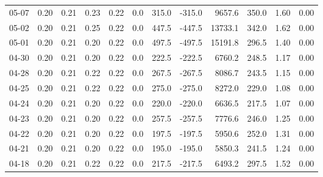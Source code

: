 \begin{threeparttable}
{\begin{tabular}{lrrrrrrrrrrr}
  05-07 &          0.20 &          0.21 &          0.23 &        0.22 &                 0.0 &               315.0 &     -315.0 &              9657.6 &            350.0 &            1.60 &                   0.00 \\
  05-02 &          0.20 &          0.21 &          0.25 &        0.22 &                 0.0 &               447.5 &     -447.5 &             13733.1 &            342.0 &            1.62 &                   0.00 \\
  05-01 &          0.20 &          0.21 &          0.20 &        0.22 &                 0.0 &               497.5 &     -497.5 &             15191.8 &            296.5 &            1.40 &                   0.00 \\
  04-30 &          0.20 &          0.21 &          0.20 &        0.22 &                 0.0 &               222.5 &     -222.5 &              6760.2 &            248.5 &            1.17 &                   0.00 \\
  04-28 &          0.20 &          0.21 &          0.22 &        0.22 &                 0.0 &               267.5 &     -267.5 &              8086.7 &            243.5 &            1.15 &                   0.00 \\
  04-25 &          0.20 &          0.21 &          0.22 &        0.22 &                 0.0 &               275.0 &     -275.0 &              8272.0 &            229.0 &            1.08 &                   0.00 \\
  04-24 &          0.20 &          0.21 &          0.20 &        0.22 &                 0.0 &               220.0 &     -220.0 &              6636.5 &            217.5 &            1.07 &                   0.00 \\
  04-23 &          0.20 &          0.21 &          0.20 &        0.22 &                 0.0 &               257.5 &     -257.5 &              7776.6 &            246.0 &            1.25 &                   0.00 \\
  04-22 &          0.20 &          0.21 &          0.20 &        0.22 &                 0.0 &               197.5 &     -197.5 &              5950.6 &            252.0 &            1.31 &                   0.00 \\
  04-21 &          0.20 &          0.21 &          0.20 &        0.22 &                 0.0 &               195.0 &     -195.0 &              5850.3 &            241.5 &            1.24 &                   0.00 \\
  04-18 &          0.20 &          0.21 &          0.22 &        0.22 &                 0.0 &               217.5 &     -217.5 &              6493.2 &            297.5 &            1.52 &                   0.00 \\

\end{tabular}}
\end{threeparttable}
